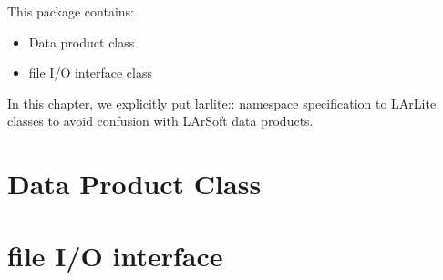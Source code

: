 
This package contains:
\begin{itemize}
\item Data product class
\item \ROOT file I/O interface class
\end{itemize}
In this chapter, we explicitly put {\ttfamily larlite::} namespace specification to LArLite classes to avoid confusion with LArSoft data products.

\section{Data Product Class}
\label{sec:dataproduct}


\section{\ROOT file I/O interface}
\label{sec:io}


